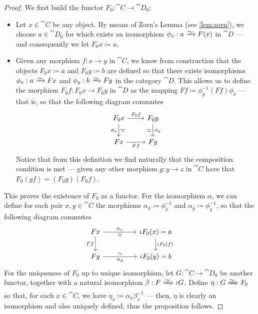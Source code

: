 \begin{proof}
We first build the functor \(F_0: \cat C \to \cat D_0\):
\begin{itemize}\setlength\itemsep{0em}
\item Let \(x \in \cat C\) be any object. By means of Zorn's Lemma (see
  \cref{lem:zorn}), we choose \(a \in \cat D_0\) for which exists an
  isomorphism \(\phi_x: a \isoto F(x)\) in \(\cat D\) --- and consequently we let
  \(F_0 x \coloneq a\).
\item Given any morphism \(f: x \to y\) in \(\cat C\), we know from
  construction that the objects \(F_0 x \coloneq a\) and \(F_0 y \coloneq b\)
  are defined so that there exists isomorphisms \(\phi_x: a \isoto F x\) and
  \(\phi_y: b \isoto F y\) in the category \(\cat D\). This allows us to define
  the morphism \(F_0 f: F_0 x \to F_0 y\) in \(\cat D\) as the mapping
  \(F f \coloneq \phi_y^{-1} (F f) \phi_x\) --- that is, so that the following
  diagram commutes
  \[
    \begin{tikzcd}
      F_0 x \ar[r, "F_0 f"] \ar[d, "\dis", "\phi_x"']
      &F_0 y \ar[d, "\dis"', "\phi_y"] \\
      F x \ar[r, swap, "F f"] &F y
    \end{tikzcd}
  \]
  Notice that from this definition we find naturally that the composition
  condition is met --- given any other morphism \(g: y \to z\) in \(\cat C\)
  have that \(F_0(g f) = (F_0 g)(F_0 f)\).
\end{itemize}
This proves the existence of \(F_0\) as a functor. For the isomorphism
\(\alpha\), we can define for each pair \(x, y \in \cat C\) the morphisms
\(\alpha_x \coloneq \phi_x^{-1}\) and \(\alpha_y \coloneq \phi_y^{-1}\), so that
the following diagram commutes
\[
  \begin{tikzcd}
    F x \ar[rr, "\alpha_x", "\dis"'] \ar[d, swap, "F f"]
    & &\iota F_0(x) = a \ar[d, "\iota F_0 (f)"] \\
    F y \ar[rr, "\alpha_y"', "\dis"]
    & &\iota F_0(y) = b
  \end{tikzcd}
\]
For the uniqueness of \(F_0\) up to unique isomorphism, let
\(G: \cat C \to \cat D_0\) be another functor, together with a natural
isomorphism \(\beta: F \isonat \iota G\). Define \(\eta: G \isonat F_0\) so
that, for each \(x \in \cat C\), we have
\(\eta_x \coloneq \alpha_x \beta_{x}^{-1}\) --- then, \(\eta\) is clearly an
isomorphism and also uniquely defined, thus the proposition follows.
\end{proof}

